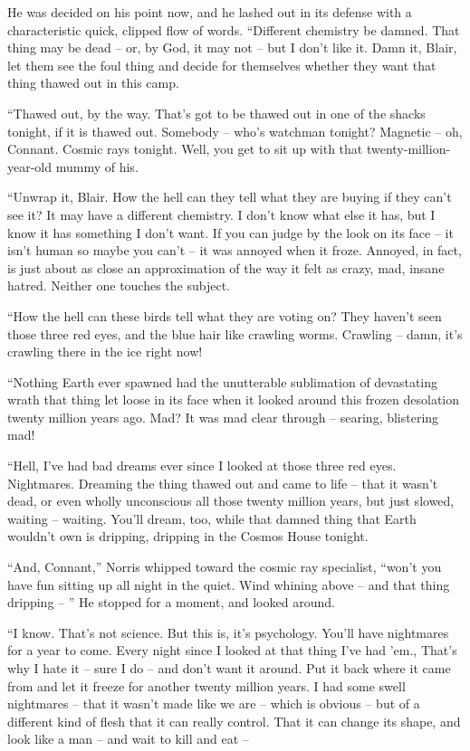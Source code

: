 \documentclass[letterpaper,openany,12pt]{memoir}		%
\begin{document}
He was decided on his point now, and he lashed out in its defense with a
characteristic quick, clipped flow of words. ``Different chemistry be damned.
That thing may be dead -- or, by God, it may not -- but I don't like it. Damn it,
Blair, let them see the foul thing and decide for themselves whether they want
that thing thawed out in this camp.

``Thawed out, by the way. That's got to be thawed out in one of the shacks
tonight, if it is thawed out. Somebody -- who's watchman tonight? Magnetic --
oh, Connant. Cosmic rays tonight. Well, you get to sit up with that
twenty-million-year-old mummy of his.

``Unwrap it, Blair. How the hell can they tell what they are buying if they
can't see it? It may have a different chemistry. I don't know what else it has,
but I know it has something I don't want. If you can judge by the look on its
face -- it isn't human so maybe you can't -- it was annoyed when it froze.
Annoyed, in fact, is just about as close an approximation of the way it felt as
crazy, mad, insane hatred. Neither one touches the subject.

``How the hell can these birds tell what they are voting on? They haven't seen
those three red eyes, and the blue hair like crawling worms. Crawling -- damn,
it's crawling there in the ice right now!

``Nothing Earth ever spawned had the unutterable sublimation of devastating
wrath that thing let loose in its face when it looked around this frozen
desolation twenty million years ago. Mad? It was mad clear through -- searing,
blistering mad!

``Hell, I've had bad dreams ever since I looked at those three red eyes.
Nightmares. Dreaming the thing thawed out and came to life -- that it wasn't
dead, or even wholly unconscious all those twenty million years, but just
slowed, waiting -- waiting. You'll dream, too, while that damned thing that
Earth wouldn't own is dripping, dripping in the Cosmos House tonight.

``And, Connant,'' Norris whipped toward the cosmic ray specialist, ``won't you
have fun sitting up all night in the quiet. Wind whining above -- and that thing
dripping -- '' He stopped for a moment, and looked around.

``I know. That's not science. But this is, it's psychology. You'll have
nightmares for a year to come. Every night since I looked at that thing I've had
'em., That's why I hate it -- sure I do -- and don't want it around. Put it back
where it came from and let it freeze for another twenty million years. I had
some swell nightmares -- that it wasn't made like we are -- which is obvious --
but of a different kind of flesh that it can really control. That it can change
its shape, and look like a man -- and wait to kill and eat --
\end{document}
